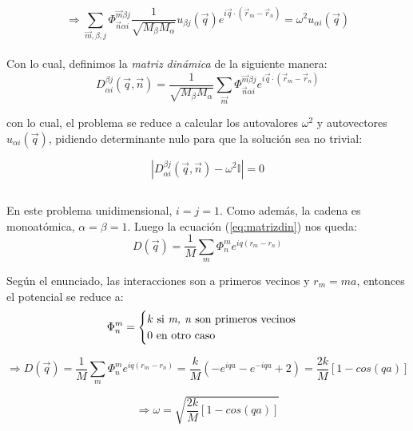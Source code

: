 \documentclass[a4paper]{article}
\begin{document}
$$ \Rightarrow \sum_{\vec{m}, \beta, j} \Phi^{\vec{m} \beta j}_{\vec{n}\alpha i}\frac{1}{\sqrt{M_{\beta}M_{\alpha}}}u_{\beta j}(\vec{q})e^{i\vec{q}\cdot(\vec{r}_{m} -\vec{r}_{n})} = \omega^{2}u_{\alpha i}(\vec{q})$$\\

Con lo cual, definimos la \textit{matriz din\'amica} de la siguiente manera:\\

\begin{equation}
\label{eq:matrizdin}
D^{\beta j}_{\alpha i}(\vec{q}, \vec{n}) = \frac{1}{\sqrt{M_{\beta}M_{\alpha}}} \sum_{\vec{m}} \Phi^{\vec{m} \beta j}_{\vec{n}\alpha i} e^{i\vec{q}\cdot(\vec{r}_{m} -\vec{r}_{n})}
\end{equation}

con lo cual, el problema se reduce a calcular los autovalores $\omega^{2}$ y autovectores $u_{\alpha i}(\vec{q})$, pidiendo determinante nulo para que la soluci\'on sea no trivial:

$$ |D^{\beta j}_{\alpha i}(\vec{q}, \vec{n}) - \omega^{2}\mathbb{I}| = 0$$

\subsection{}

En este problema unidimensional, $i = j = 1$. Como adem\'as, la cadena es monoat\'omica, $\alpha = \beta = 1$. Luego la ecuaci\'on (\ref{eq:matrizdin}) nos queda:\\

$$ D(\vec{q}) = \frac{1}{M}\sum_{m}\Phi^{m}_{n}e^{iq(r_{m} - r_{n})}$$

Seg\'un el enunciado, las interacciones son a primeros vecinos y $r_{m} = ma$, entonces el potencial se reduce a:\\

$$  \Phi^{m}_{n} = \begin{cases}
k \text { si \textit{m, n} son primeros vecinos} \\
0 \text { en otro caso}
\end{cases}$$

$$ \Rightarrow D(\vec{q}) = \frac{1}{M}\sum_{m}\Phi^{m}_{n}e^{iq(r_{m} - r_{n})} = \frac{k}{M}(-e^{iqa} - e^{-iqa} + 2) = \frac{2k}{M}[1 - cos(qa)]$$

$$ \Rightarrow \omega = \sqrt{\frac{2k}{M}[1 - cos(qa)]}$$

\subsection{}


\newpage
\begin{thebibliography}{99} %
 
\end{thebibliography}


\end{document}
